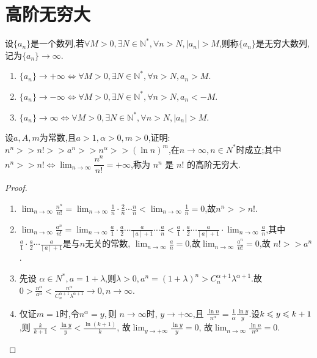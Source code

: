 \section{高阶无穷大}

\begin{definition}[无穷大]\label{def:infinite}
    设$\{a_n\}$是一个数列,若$\forall M>0, \exists N\in \mathbb{N}^*, \forall n>N, |a_n|>M$,则称$\{a_n\}$是无穷大数列,记为$\{a_n\} \rightarrow \infty$.
\end{definition}

\begin{enumerate}
    \item $\{a_n\} \rightarrow +\infty \Leftrightarrow \forall M>0, \exists N\in \mathbb{N}^*, \forall n>N, a_n>M$.
    \item $\{a_n\} \rightarrow -\infty \Leftrightarrow \forall M>0, \exists N\in \mathbb{N}^*, \forall n>N, a_n<-M$.
    \item $\{a_n\} \rightarrow \infty \Leftrightarrow \forall M>0, \exists N\in \mathbb{N}^*, \forall n>N, |a_n|>M$.
\end{enumerate}

\begin{proposition}[常用无穷大数列的比较]
    设$a,A ,m$为常数,且$a>1,\alpha >0,m>0$,证明:
    $n^n >> n! >> a^n >> n^\alpha >> (\ln n)^m$,在$n \rightarrow \infty,n \in N^*$时成立;其中$n^n >> n! \Leftrightarrow \lim_{n \to \infty} \dfrac{n^n}{n!} = +\infty$,称为 $n^n$ 是 $n!$ 的高阶无穷大.
\end{proposition}

\begin{proof}
    \begin{enumerate}
        \item $\lim_{n \to \infty} \frac{n^n}{n!} = \lim_{n \to \infty} \frac{1}{n} \cdot \frac{2}{n} \cdots \frac{n}{n} < \lim_{n \to \infty} \frac{1}{n} = 0$,故$n^n >> n!$.
        \item $\lim_{n \to \infty} \frac{a^n}{n!} = \lim_{n \to \infty} \frac{a}{1} \cdot \frac{a}{2} \cdots \frac{a}{[a] + 1} \cdots \frac{a}{n} < \frac{a}{1} \cdot \frac{a}{2} \cdots \frac{a}{[a] + 1} \cdot \lim_{n \to \infty} \frac{a}{n}$,其中 $\frac{a}{1} \cdot \frac{a}{2} \cdots \frac{a}{[a] + 1}$是与$n$无关的常数, $\lim_{n \to \infty} \frac{a}{n} = 0$,故$\lim_{n \to \infty} \frac{a^n}{n!} =0$,故 $ n ! >>a^n$.
        \item 先设 $\alpha \in N^*,a = 1 + \lambda$,则$\lambda>0 , a^n = (1+ \lambda)^n > C_{n}^{\alpha +1} \lambda^{\alpha + 1}$.故$0 > \frac{n^\alpha}{a^n} < \frac{n^\alpha}{C_n^{\alpha +1} \lambda^{\alpha +1}} \to 0 , n \to \infty$.
        \item 仅证$m = 1$时,令$n^\alpha = y, $则 $n \to \infty $时, $y \to + \infty$,且 $\frac{\ln n}{n^\alpha}= \frac{1}{\alpha} \frac{\ln y}{y}$.设$ k \leqslant y \leqslant k+1$,则 $\frac{k}{k+1} < \frac{\ln y}{y} < \frac{\ln(k+1)}{k}$, 故$\lim_{y \to +\infty} \frac{\ln y}{y} = 0$, 故$\lim_{n \to \infty} \frac{\ln n}{n^\alpha} = 0$.
    \end{enumerate}
\end{proof}

